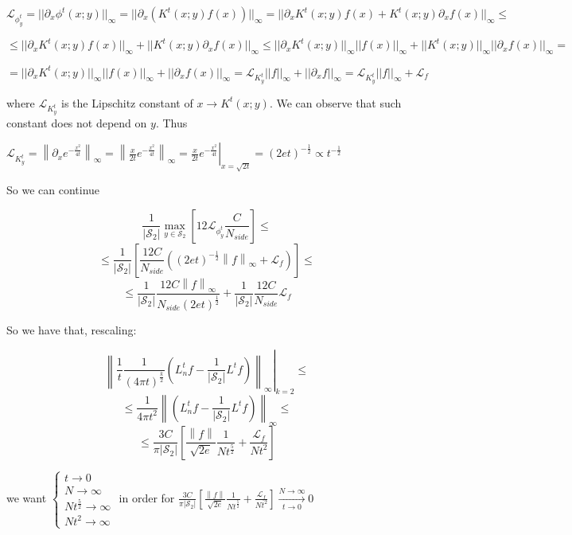 $\mathcal L_{\phi^t_y} = ||\partial_x\phi^t(x;y)||_\infty = ||\partial_x\left(K^t(x;y)f(x)\right)||_\infty = ||\partial_x K^t(x;y)f(x) + K^t(x;y)\partial_x f(x)||_\infty \leq$

$ \leq ||\partial_x K^t(x;y)f(x)||_\infty + ||K^t(x;y)\partial_x f(x)||_\infty \leq  ||\partial_x K^t(x;y)||_\infty||f(x)||_\infty + ||K^t(x;y)||_\infty||\partial_x f(x)||_\infty = $

$ = ||\partial_x K^t(x;y)||_\infty||f(x)||_\infty + ||\partial_x f(x)||_\infty = \mathcal L_{K^t_y} ||f||_\infty + ||\partial_xf||_\infty = \mathcal L_{K^t_y} ||f||_\infty + \mathcal L_f$

where $\mathcal L_{K^t_y}$ is the Lipschitz constant of $x\rightarrow K^t(x;y)$. We can observe that such constant does not depend on $y$. Thus

\newcommand{\norm}[1]{\left\lVert#1\right\rVert}

$\mathcal L_{K^t_y} = \norm{\partial_x e^{-\frac{x^2}{4t}}}_\infty = \norm{\frac{x}{2t}e^{-\frac{x^2}{4t}}}_\infty = \left. \frac{x}{2t}e^{-\frac{x^2}{4t}}\right|_{x=\sqrt{2t}}=(2et)^{-\frac{1}{2}}\propto t ^ {-\frac{1}{2}}$

So we can continue

$$ \frac{1}{|\mathcal S_2|} \max _{y\in \mathcal S_2} \left[ 12 \mathcal L_{\phi^t_y} \frac{C}{N_{side}} \right]\leq$$
$$ \leq \frac{1}{|\mathcal S_2|} \left[   \frac{12C}{N_{side}} \left( (2et)^{-\frac{1}{2}} \norm{f}_\infty + \mathcal L_f \right)\right]\leq$$
$$  \leq \frac{1}{|\mathcal S_2|} \frac{12C\norm{f}_\infty}{N_{side}(2et)^\frac{1}{2}} +   \frac{1}{|\mathcal S_2|} \frac{12C}{N_{side}}\mathcal L_f$$

So we have that, rescaling:

$$\left.\norm{\frac{1}{t}\frac{1}{(4\pi t)^{\frac{k}{2}}}\left(L_n^tf-\frac{1}{|\mathcal S_2|}L^tf\right)}_\infty\right|_{k=2}\leq$$
$$\leq \frac{1}{4\pi t^2}\norm{\left(L_n^tf-\frac{1}{|\mathcal S_2|}L^tf\right)}_\infty \leq$$
$$ \leq \frac{3C}{\pi |\mathcal S_2|}\left[\frac{\norm{f}}{\sqrt{2e}}\frac{1}{Nt^\frac{5}{2}} + \frac{\mathcal L_f}{Nt^2}\right]$$

we want $\begin{cases}
t \rightarrow 0\\
N \rightarrow \infty\\
Nt^\frac{5}{2} \rightarrow \infty\\
Nt^2 \rightarrow \infty
\end{cases}$ in order for $ \frac{3C}{\pi |\mathcal S_2|}\left[\frac{\norm{f}}{\sqrt{2e}}\frac{1}{Nt^\frac{5}{2}} + \frac{\mathcal L_f}{Nt^2}\right] \xrightarrow[t\to 0 ]{N\to\infty}0$


